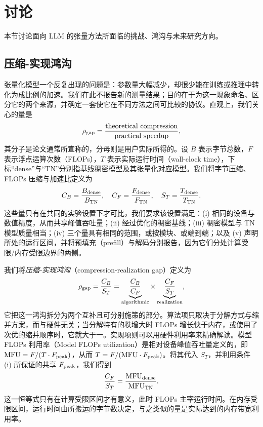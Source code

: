 \documentclass[11pt]{article}
\begin{document}
\section{讨论}
\label{sec:future-directions}
本节讨论面向 LLM 的张量方法所面临的挑战、鸿沟与未来研究方向。

\subsection{压缩-实现鸿沟}
张量化模型一个反复出现的问题是：参数量大幅减少，却很少能在训练或推理中转化为成比例的加速。我们在此不报告新的测量结果；目的在于为这一现象命名、区分它的两个来源，并确定一套使它在不同方法之间可比较的协议。直观上，我们关心的量是
\begin{equation*}
  \rho_{\rm gap} = \frac{\text{theoretical compression}}{\text{practical speedup}},
\end{equation*}
其分子是论文通常所宣称的，分母则是用户实际所得的。设 $B$ 表示字节总数，$F$ 表示浮点运算次数（FLOPs），$T$ 表示实际运行时间（wall-clock time），下标``dense''与``TN''分别指基线稠密模型及其张量化对应模型。我们将字节压缩、FLOPs 压缩与加速比定义为
\begin{equation}
  C_B = \frac{B_{\rm dense}}{B_{\rm TN}}, \quad
  C_F = \frac{F_{\rm dense}}{F_{\rm TN}}, \quad
  S_T = \frac{T_{\rm dense}}{T_{\rm TN}}.
\end{equation}
这些量只有在共同的实验设置下才可比，我们要求该设置满足：(i) 相同的设备与数值精度，从而共享峰值吞吐量；(ii) 经过优化的稠密基线；(iii) 稠密模型与 TN 模型质量相当；(iv) 三个量具有相同的范围，或按模块、或端到端；以及 (v) 声明所处的运行区间，并将预填充（prefill）与解码分别报告，因为它们分处计算受限/内存受限边界的两侧。

我们将\emph{压缩-实现鸿沟}（compression-realization gap）定义为
\begin{equation}
  \rho_{\rm gap} = \frac{C_B}{S_T}
  = \underbrace{\frac{C_B}{C_F}}_{\text{algorithmic}} \times
    \underbrace{\frac{C_F}{S_T}}_{\text{realization}},
  \label{eq:rho-gap}
\end{equation}
它把这一鸿沟拆分为两个互补且可分别施策的部分。算法项只取决于分解方式与缩并方案，而与硬件无关；当分解特有的秩增大时 FLOPs 增长快于内存，或使用了次优的缩并顺序时，它就大于一。实现项则可以用硬件利用率来精确解读。模型 FLOPs 利用率（Model FLOPs utilization）是相对设备峰值吞吐量定义的，即 $\mathrm{MFU} = F / (T \cdot F_{\rm peak})$，从而 $T = F / (\mathrm{MFU} \cdot F_{\rm peak})$。将其代入 $S_T$，并利用条件 (i) 所保证的共享 $F_{\rm peak}$，我们得到
\begin{equation}
  \frac{C_F}{S_T} = \frac{\mathrm{MFU}_{\rm dense}}{\mathrm{MFU}_{\rm TN}}.
\end{equation}
这一恒等式只有在计算受限区间才有意义，此时 FLOPs 主宰运行时间。在内存受限区间，运行时间由所搬运的字节数决定，与之类似的量是实际达到的内存带宽利用率。
\end{document}
